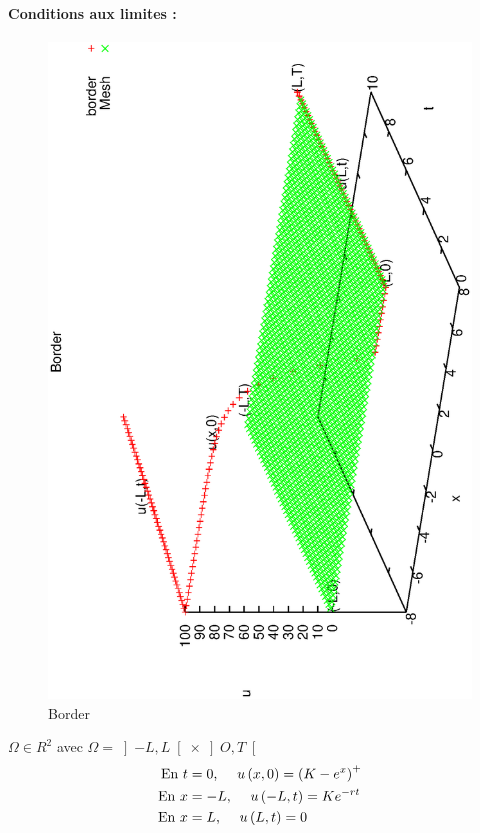 \documentclass{book}
\begin{document}
\paragraph{Conditions aux limites :} 
\begin{figure}
\centering
\includegraphics[angle=-90, scale=0.30]{Born}%
\caption{Border}
\end{figure} 
$\Omega \in R^{2}$ avec $\Omega=\left]-L,L\right[\times\left]O,T\right[$ 
\vspace{1cm}
\begin{equation}
\label{condition-limite-P1}
\begin{split}
 \hbox{En }t &=0\hbox{,\hspace{0.5cm}} u\left(x,0\right)=\left(K-e^{x}\right)^{+} \\
 \hbox{En }x &=-L\hbox{,\hspace{0.5cm}} u\left(-L,t\right)=Ke^{-rt} \\
 \hbox{En }x &=L\hbox{,\hspace{0.5cm}} u\left(L,t\right)=0
\end{split}
\end{equation}
\end{document}

